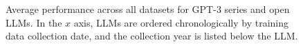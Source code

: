 \documentclass[letterpaper]{article} %
\begin{document}
\begin{figure}[h!]
\begin{subfigure}[b]{0.475\textwidth}
            \label{fig:Open-datasets}
        \end{subfigure}
        \caption[]
        {Average performance across all datasets for GPT-3 series and open LLMs. In the $x$ axis, LLMs are ordered chronologically by training data collection date, and the collection year is listed below the LLM.} 
        \label{fig:experiments-average-all}
    \end{figure}


\end{document}
